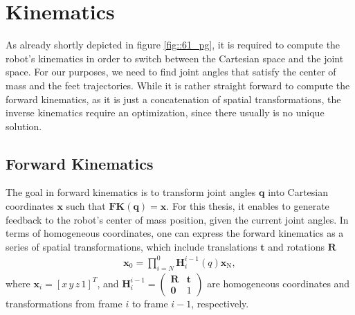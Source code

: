 
\FloatBarrier
\section{Kinematics}
\label{sec::24_k}
As already shortly depicted in figure \ref{fig::61_pg}, it is required to compute the robot's kinematics in order to switch between the Cartesian space and the joint space. For our purposes, we need to find joint angles that satisfy the center of mass and the feet trajectories. While it is rather straight forward to compute the forward kinematics, as it is just a concatenation of spatial transformations, the inverse kinematics require an optimization, since there usually is no unique solution.

\FloatBarrier
\subsection{Forward Kinematics}
\label{sec::241_fk}
The goal in forward kinematics is to transform joint angles $\bm{q}$ into Cartesian coordinates $\bm{x}$ such that $\textbf{FK}(\bm{q}) = \bm{x}$. For this thesis, it enables to generate feedback to the robot's center of mass position, given the current joint angles. In terms of homogeneous coordinates, one can express the forward kinematics as a series of spatial transformations, which include translations $\bm{t}$ and rotations $\bm{R}$ 
\begin{align}
	\bm{x}_\text{0} = \prod_{i=N}^{0}\bm{H}_i^{i-1}(q)\bm{x}_\text{N},
\end{align}
where $\bm{x}_i=[x\,y\,z\,1]^T$, and $\bm{H}_i^{i-1}=\begin{pmatrix}\bm{R} & \bm{t} \\ \bm{0} & 1 \end{pmatrix}$ are homogeneous coordinates and transformations from frame $i$ to frame $i-1$, respectively.

\FloatBarrier
